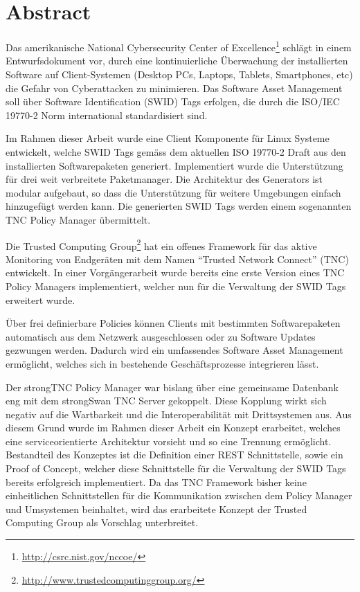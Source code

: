 \chapter{Abstract}

Das amerikanische National Cybersecurity Center of
Excellence\footnote{\url{http://csrc.nist.gov/nccoe/}} schlägt in einem
Entwurfsdokument vor, durch eine kontinuierliche Überwachung der installierten
Software auf Client-Systemen (Desktop PCs, Laptops, Tablets, Smartphones, etc)
die Gefahr von Cyberattacken zu minimieren. Das Software Asset Management soll
über Software Identification (SWID) Tags erfolgen, die durch die ISO/IEC
19770-2\cite{iso19770-2} Norm international standardisiert sind.

Im Rahmen dieser Arbeit wurde eine Client Komponente für Linux Systeme
entwickelt, welche SWID Tags gemäss dem aktuellen ISO 19770-2 Draft aus den
installierten Softwarepaketen generiert. Implementiert wurde die Unterstützung
für drei weit verbreitete Paketmanager. Die Architektur des Generators ist
modular aufgebaut, so dass die Unterstützung für weitere Umgebungen einfach
hinzugefügt werden kann. Die generierten SWID Tags werden einem sogenannten TNC
Policy Manager übermittelt.

Die Trusted Computing
Group\footnote{\url{http://www.trustedcomputinggroup.org/}} hat ein offenes
Framework für das aktive Monitoring von Endgeräten mit dem Namen
\enquote{Trusted Network Connect} (TNC) entwickelt. In einer Vorgängerarbeit
wurde bereits eine erste Version eines TNC Policy Managers implementiert,
welcher nun für die Verwaltung der SWID Tags erweitert wurde.

Über frei definierbare Policies können Clients mit bestimmten Softwarepaketen
automatisch aus dem Netzwerk ausgeschlossen oder zu Software Updates gezwungen
werden. Dadurch wird ein umfassendes Software Asset Management ermöglicht,
welches sich in bestehende Geschäftsprozesse integrieren lässt.

Der strongTNC Policy Manager war bislang über eine gemeinsame Datenbank eng mit
dem strongSwan TNC Server gekoppelt. Diese Kopplung wirkt sich negativ auf die
Wartbarkeit und die Interoperabilität mit Drittsystemen aus. Aus diesem Grund
wurde im Rahmen dieser Arbeit ein Konzept erarbeitet, welches eine
serviceorientierte Architektur vorsieht und so eine Trennung ermöglicht.
Bestandteil des Konzeptes ist die Definition einer REST Schnittstelle, sowie ein
Proof of Concept, welcher diese Schnittstelle für die Verwaltung der SWID Tags
bereits erfolgreich implementiert. Da das TNC Framework bisher keine
einheitlichen Schnittstellen für die Kommunikation zwischen dem Policy Manager
und Umsystemen beinhaltet, wird das erarbeitete Konzept der Trusted Computing
Group als Vorschlag unterbreitet.

